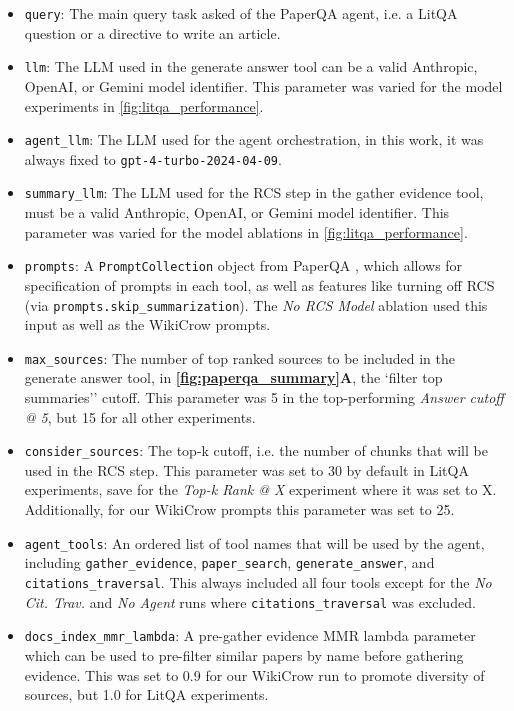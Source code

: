 \begin{itemize}
\item \texttt{query}: The main query task asked of the PaperQA agent, i.e. a LitQA question or a directive to write an article. 
\item \texttt{llm}: The LLM used in the generate answer tool can be a valid Anthropic, OpenAI, or Gemini model identifier. This parameter was varied for the model experiments in \autoref{fig:litqa_performance}.
\item \texttt{agent\_llm}: The LLM used for the agent orchestration, in this work, it was always fixed to \texttt{gpt-4-turbo-2024-04-09}.
\item \texttt{summary\_llm}: The LLM used for the RCS step in the gather evidence tool, must be a valid Anthropic, OpenAI, or Gemini model identifier. This parameter was varied for the model ablations in \autoref{fig:litqa_performance}.
\item \texttt{prompts}: A \texttt{PromptCollection} object from PaperQA \cite{lala2023paperqa}, which allows for specification of prompts in each tool, as well as features like turning off RCS (via \texttt{prompts.skip\_summarization}). The \textit{No RCS Model} ablation used this input as well as the WikiCrow prompts.
\item \texttt{max\_sources}: The number of top ranked sources to be included in the generate answer tool, in \textbf{\autoref{fig:paperqa_summary}A}, the `filter top summaries'' cutoff. This parameter was 5 in the top-performing \textit{Answer cutoff @ 5}, but 15 for all other experiments.
\item \texttt{consider\_sources}: The top-k cutoff, i.e. the number of chunks that will be used in the RCS step. This parameter was set to 30 by default in LitQA experiments, save for the \textit{Top-k Rank @ X} experiment where it was set to X. Additionally, for our WikiCrow prompts this parameter was set to 25. 
\item \texttt{agent\_tools}: An ordered list of tool names that will be used by the agent, including \texttt{gather\_evidence}, \texttt{paper\_search}, \texttt{generate\_answer}, and \texttt{citations\_traversal}. This always included all four tools except for the \textit{No Cit. Trav.} and \textit{No Agent} runs where \texttt{citations\_traversal} was excluded.
\item \texttt{docs\_index\_mmr\_lambda}: A pre-gather evidence MMR lambda parameter which can be used to pre-filter similar papers by name before gathering evidence. This was set to 0.9 for our WikiCrow run to promote diversity of sources, but 1.0 for LitQA experiments. 

\end{itemize}
